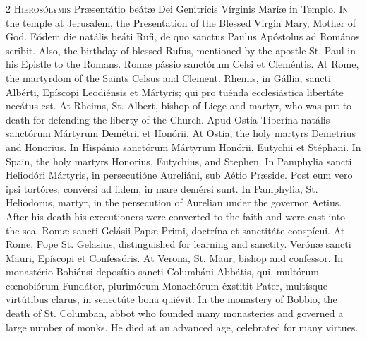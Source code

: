 \begin{paracol}{2}
\lettrine[lines=2]{H}{ierosólymis} Præsentátio beátæ Dei Genitrícis Vírginis Maríæ in Templo.
\switchcolumn
{}
\lettrine[lines=2]{I}{n} the temple at Jerusalem, the 
 Presentation of the Blessed Virgin Mary, Mother of God.
\switchcolumn*
{}
Eódem die natális beáti 
 Rufi, de quo sanctus Paulus Apóstolus ad Romános scribit.
\switchcolumn
{}
Also, the birthday of blessed Rufus, 
 mentioned by the apostle St. Paul in his Epistle to the Romans.
\switchcolumn*
{}
Romæ pássio sanctórum 
 Celsi et Cleméntis.
\switchcolumn
{}
At Rome, the martyrdom of the Saints 
 Celsus and Clement.
\switchcolumn*
{}
Rhemis, in Gállia, 
 sancti Albérti, Epíscopi Leodiénsis et Mártyris; qui pro tuénda 
 ecclesiástica libertáte necátus est.
\switchcolumn
{}
At Rheims, St. Albert, bishop of 
 Liege and martyr, who was put to death for defending the liberty of the 
 Church.
\switchcolumn*
{}
Apud Ostia Tiberína 
 natális sanctórum Mártyrum Demétrii et Honórii.
\switchcolumn
{}
At Ostia, the holy martyrs Demetrius 
 and Honorius.
\switchcolumn*
{}
In Hispánia sanctórum 
 Mártyrum Honórii, Eutychii et Stéphani.
\switchcolumn
{}
In Spain, the holy martyrs Honorius, 
 Eutychius, and Stephen.
\switchcolumn*
{}
In Pamphylia sancti 
 Heliodóri Mártyris, in persecutióne Aureliáni, sub Aétio Præside. Post 
 eum vero ipsi tortóres, convérsi ad fidem, in mare demérsi sunt.
\switchcolumn
{}
In Pamphylia, St. Heliodorus, 
 martyr, in the persecution of Aurelian under the governor Aetius. 
 After his death his executioners were converted to the faith and were cast 
 into the sea.
\switchcolumn*
{}
Romæ sancti Gelásii 
 Papæ Primi, doctrína et sanctitáte conspícui.
\switchcolumn
{}
At Rome, Pope St. Gelasius, 
 distinguished for learning and sanctity.
\switchcolumn*
{}
Verónæ sancti Mauri, 
 Epíscopi et Confessóris.
\switchcolumn
{}
At Verona, St. Maur, bishop and 
 confessor.
\switchcolumn*
{}
In monastério Bobiénsi 
 deposítio sancti Columbáni Abbátis, qui, multórum cœnobiórum Fundátor, 
 plurimórum Monachórum éxstitit Pater, multísque virtútibus clarus, in 
 senectúte bona quiévit.
\switchcolumn
{}
In the monastery of Bobbio, the 
 death of St. Columban, abbot who founded many monasteries and governed a 
 large number of monks. He died at an advanced age, celebrated for many 
 virtues.
\switchcolumn*
{}
\end{paracol}


